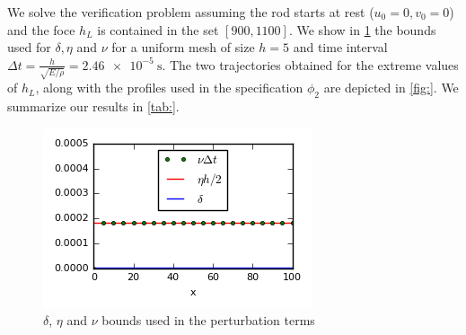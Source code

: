 \documentclass[letterpaper, 10 pt, conference]{ieeeconf/ieeeconf}
\begin{document}
We solve the verification problem assuming the rod starts at rest ($u_0 = 0,
v_0 = 0$) and the foce $h_L$ is contained in the set $[900, 1100]$. We show in
\cref{fig:bounds_mech} the bounds used for $\delta, \eta$ and $\nu$ for a
uniform mesh of size $h=5$ and time interval $\Delta t = \frac{h}{\sqrt{E
/ \rho}} = \SI{2.46e-5}{\second}$. The two trajectories
obtained for the extreme values of $h_L$, along with the profiles used in the
specification $\phi_2$ are depicted in \cref{fig:}. We summarize our results in \cref{tab:}.

\begin{figure}
    \centering
    \begin{minipage}[c]{0.5\columnwidth}
        \includegraphics[width=\textwidth]{figures/pert_plot_mech.png}
    \end{minipage}\hfill
    \begin{minipage}[c]{0.5\columnwidth}
        \caption{$\delta$, $\eta$ and $\nu$ bounds used in the perturbation terms}
        \label{fig:bounds_mech}
    \end{minipage}
\end{figure}
\end{document}
